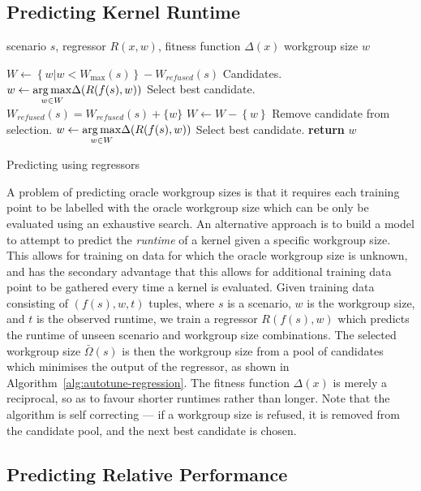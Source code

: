 \documentclass[nonatbib,preprint,10pt]{sigplanconf}
\begin{document}
\subsection{Predicting Kernel Runtime}

\begin{algorithm}[t]
\begin{algorithmic}[1]
\Require scenario $s$, regressor $R(x, w)$, fitness function $\Delta(x)$
\Ensure workgroup size $w$

\State $W \leftarrow \left\{ w | w < W_{\max}(s) \right\} -
W_{refused}(s)$
\Comment Candidates.
\State $w \leftarrow \underset{w \in W}{\operatorname*{arg\,max}} \Delta(R(f(s), w))$
\Comment Select best candidate.
  \State $W_{refused}(s) = W_{refused}(s) + \{w\}$
  \State $W \leftarrow W - \left\{ w \right\}$
  \Comment Remove candidate from selection.
  \State $w \leftarrow \underset{w \in W}{\operatorname*{arg\,max}} \Delta(R(f(s), w))$
  \Comment Select best candidate.
\EndWhile
\State \textbf{return} $w$
\end{algorithmic}
\caption{Predicting using regressors}
\label{alg:autotune-regression}
\end{algorithm}

A problem of predicting oracle workgroup sizes is that it requires
each training point to be labelled with the oracle workgroup size
which can be only be evaluated using an exhaustive search. An
alternative approach is to build a model to attempt to predict the
\emph{runtime} of a kernel given a specific workgroup size. This
allows for training on data for which the oracle workgroup size is
unknown, and has the secondary advantage that this allows for
additional training data point to be gathered every time a kernel is
evaluated. Given training data consisting of $(f(s),w,t)$ tuples,
where $s$ is a scenario, $w$ is the workgroup size, and $t$ is the
observed runtime, we train a regressor $R(f(s), w)$ which predicts the
runtime of unseen scenario and workgroup size combinations. The
selected workgroup size $\bar{\Omega}(s)$ is then the workgroup size
from a pool of candidates which minimises the output of the regressor,
as shown in Algorithm~\ref{alg:autotune-regression}. The fitness
function $\Delta(x)$ is merely a reciprocal, so as to favour shorter
runtimes rather than longer. Note that the algorithm is self
correcting --- if a workgroup size is refused, it is removed from the
candidate pool, and the next best candidate is chosen.


\subsection{Predicting Relative Performance}
\end{document}
